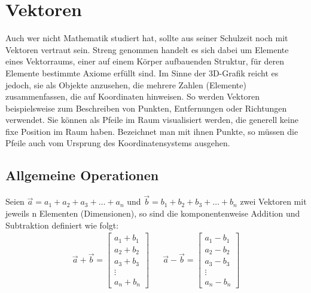 \chapter{Vektoren}

Auch wer nicht Mathematik studiert hat, sollte aus seiner Schulzeit noch mit Vektoren vertraut sein. Streng genommen handelt es sich dabei um Elemente eines Vektorraums, einer auf einem Körper aufbauenden Struktur, für deren Elemente bestimmte Axiome erfüllt sind. Im Sinne der 3D-Grafik reicht es jedoch, sie als Objekte anzusehen, die mehrere Zahlen (Elemente) zusammenfassen, die auf Koordinaten hinweisen. So werden Vektoren beispielsweise zum Beschreiben von Punkten, Entfernungen oder Richtungen verwendet. Sie können als Pfeile im Raum visualisiert werden, die generell keine fixe Position im Raum haben. Bezeichnet man mit ihnen Punkte, so müssen die Pfeile auch vom Ursprung des Koordinatensystems ausgehen. \parencite[\cf][46-47]{big} %

\section{Allgemeine Operationen}

Seien $\vec{a}=a_1+a_2+a_3+\dots{}+a_n$ und $\vec{b}=b_1+b_2+b_3+\dots{}+b_n$ zwei Vektoren mit jeweils n Elementen (Dimensionen), so sind die komponentenweise Addition und Subtraktion definiert wie folgt:
\begin{align}\label{vecadd}
\vec{a} + \vec{b} =
\begin{bmatrix} a_1+b_1 \\ a_2+b_2 \\ a_3+b_3 \\ \vdots \\ a_n+b_n \end{bmatrix}&&
\vec{a} - \vec{b} =
\begin{bmatrix} a_1-b_1 \\ a_2-b_2 \\ a_3-b_3 \\ \vdots \\ a_n-b_n \end{bmatrix}
\end{align}
\parencite[\cf]{small}

